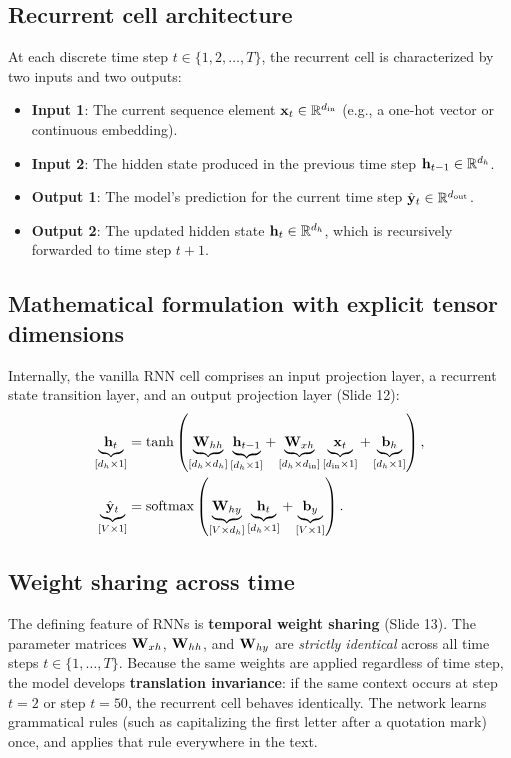 \documentclass[../../main.tex]{subfiles}
\begin{document}
\subsection{Recurrent cell architecture}
At each discrete time step $t \in \{1, 2, \dots, T\}$, the recurrent cell is characterized by two inputs and two outputs:
\begin{itemize}
    \item \textbf{Input 1}: The current sequence element $\mathbf{x}_t \in \mathbb{R}^{d_{\text{in}}}$ (e.g., a one-hot vector or continuous embedding).
    \item \textbf{Input 2}: The hidden state produced in the previous time step $\mathbf{h}_{t-1} \in \mathbb{R}^{d_h}$.
    \item \textbf{Output 1}: The model's prediction for the current time step $\hat{\mathbf{y}}_t \in \mathbb{R}^{d_{\text{out}}}$.
    \item \textbf{Output 2}: The updated hidden state $\mathbf{h}_t \in \mathbb{R}^{d_h}$, which is recursively forwarded to time step $t+1$.
\end{itemize}

\subsection{Mathematical formulation with explicit tensor dimensions}
Internally, the vanilla RNN cell comprises an input projection layer, a recurrent state transition layer, and an output projection layer (Slide 12):
\begin{align}
\underbrace{\mathbf{h}_t}_{[d_h \times 1]} &= \tanh\left( \underbrace{\mathbf{W}_{hh}}_{[d_h \times d_h]} \underbrace{\mathbf{h}_{t-1}}_{[d_h \times 1]} + \underbrace{\mathbf{W}_{xh}}_{[d_h \times d_{\text{in}}]} \underbrace{\mathbf{x}_t}_{[d_{\text{in}} \times 1]} + \underbrace{\mathbf{b}_h}_{[d_h \times 1]} \right), \label{eq:rnn_hidden_step} \\
\underbrace{\hat{\mathbf{y}}_t}_{[V \times 1]} &= \operatorname{\mathrm{softmax}}\left( \underbrace{\mathbf{W}_{hy}}_{[V \times d_h]} \underbrace{\mathbf{h}_t}_{[d_h \times 1]} + \underbrace{\mathbf{b}_y}_{[V \times 1]} \right). \label{eq:rnn_output_step}
\end{align}

\subsection{Weight sharing across time}
The defining feature of RNNs is \textbf{temporal weight sharing} (Slide 13). The parameter matrices $\mathbf{W}_{xh}$, $\mathbf{W}_{hh}$, and $\mathbf{W}_{hy}$ are \emph{strictly identical} across all time steps $t \in \{1, \dots, T\}$. 
Because the same weights are applied regardless of time step, the model develops \textbf{translation invariance}: if the same context occurs at step $t=2$ or step $t=50$, the recurrent cell behaves identically. The network learns grammatical rules (such as capitalizing the first letter after a quotation mark) once, and applies that rule everywhere in the text.
\end{document}
